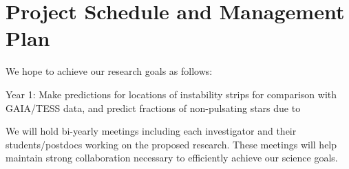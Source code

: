 \section{Project Schedule and Management Plan}

We hope to achieve our research goals as follows:

Year 1: Make predictions for locations of instability strips for comparison with GAIA/TESS data, and predict fractions of non-pulsating stars due to  

We will  hold bi-yearly meetings including each investigator and their students/postdocs working on the proposed research. These meetings will help maintain strong collaboration necessary to efficiently achieve our science goals.
